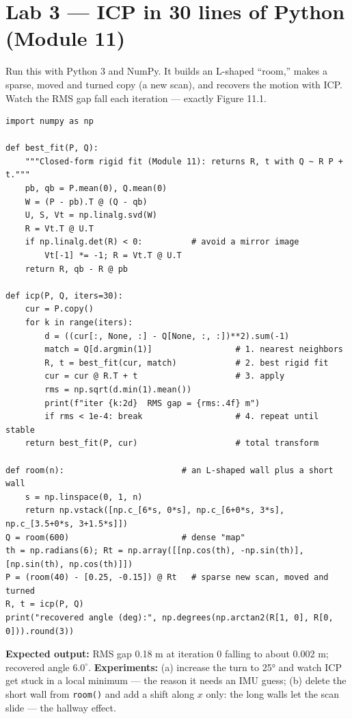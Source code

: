 \section*{Lab 3 --- ICP in 30 lines of Python (Module 11)}
Run this with Python 3 and NumPy. It builds an L-shaped ``room,'' makes a sparse, moved and turned copy (a new scan), and recovers the motion with ICP. Watch the RMS gap fall each iteration --- exactly Figure 11.1.
\begin{tcolorbox}[base,colback=gray!4,colframe=grayx,title={icp\_lab.py}]
\scriptsize
\begin{verbatim}
import numpy as np

def best_fit(P, Q):
    """Closed-form rigid fit (Module 11): returns R, t with Q ~ R P + t."""
    pb, qb = P.mean(0), Q.mean(0)
    W = (P - pb).T @ (Q - qb)
    U, S, Vt = np.linalg.svd(W)
    R = Vt.T @ U.T
    if np.linalg.det(R) < 0:          # avoid a mirror image
        Vt[-1] *= -1; R = Vt.T @ U.T
    return R, qb - R @ pb

def icp(P, Q, iters=30):
    cur = P.copy()
    for k in range(iters):
        d = ((cur[:, None, :] - Q[None, :, :])**2).sum(-1)
        match = Q[d.argmin(1)]                 # 1. nearest neighbors
        R, t = best_fit(cur, match)            # 2. best rigid fit
        cur = cur @ R.T + t                    # 3. apply
        rms = np.sqrt(d.min(1).mean())
        print(f"iter {k:2d}  RMS gap = {rms:.4f} m")
        if rms < 1e-4: break                   # 4. repeat until stable
    return best_fit(P, cur)                    # total transform

def room(n):                        # an L-shaped wall plus a short wall
    s = np.linspace(0, 1, n)
    return np.vstack([np.c_[6*s, 0*s], np.c_[6+0*s, 3*s], np.c_[3.5+0*s, 3+1.5*s]])
Q = room(600)                       # dense "map"
th = np.radians(6); Rt = np.array([[np.cos(th), -np.sin(th)], [np.sin(th), np.cos(th)]])
P = (room(40) - [0.25, -0.15]) @ Rt   # sparse new scan, moved and turned
R, t = icp(P, Q)
print("recovered angle (deg):", np.degrees(np.arctan2(R[1, 0], R[0, 0])).round(3))
\end{verbatim}
\end{tcolorbox}
\textbf{Expected output:} RMS gap 0.18 m at iteration 0 falling to about 0.002 m; recovered angle $6.0^\circ$. \textbf{Experiments:} (a) increase the turn to 25° and watch ICP get stuck in a local minimum --- the reason it needs an IMU guess; (b) delete the short wall from \texttt{room()} and add a shift along $x$ only: the long walls let the scan slide --- the hallway effect.

